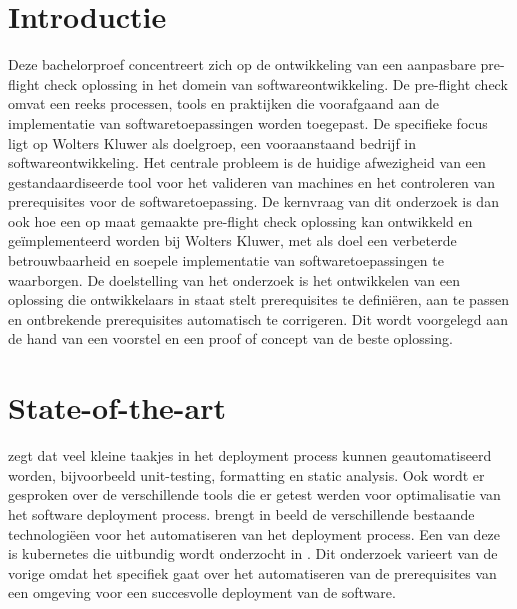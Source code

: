 
\section{Introductie}%
\label{sec:introductie}

Deze bachelorproef concentreert zich op de ontwikkeling van een aanpasbare pre-flight check oplossing in het domein van softwareontwikkeling. De pre-flight check omvat een reeks processen, tools en praktijken die voorafgaand aan de implementatie van softwaretoepassingen worden toegepast. De specifieke focus ligt op Wolters Kluwer als doelgroep, een vooraanstaand bedrijf in softwareontwikkeling. Het centrale probleem is de huidige afwezigheid van een gestandaardiseerde tool voor het valideren van machines en het controleren van prerequisites voor de softwaretoepassing. De kernvraag van dit onderzoek is dan ook hoe een op maat gemaakte pre-flight check oplossing kan ontwikkeld en geïmplementeerd worden bij Wolters Kluwer, met als doel een verbeterde betrouwbaarheid en soepele implementatie van softwaretoepassingen te waarborgen. De doelstelling van het onderzoek is het ontwikkelen van een oplossing die ontwikkelaars in staat stelt prerequisites te definiëren, aan te passen en ontbrekende prerequisites automatisch te corrigeren. Dit wordt voorgelegd aan de hand van een voorstel en een proof of concept van de beste oplossing.






\section{State-of-the-art}%
\label{sec:state-of-the-art}

\textcite{Sailer_2019} zegt dat veel kleine taakjes in het deployment process kunnen geautomatiseerd worden, bijvoorbeeld unit-testing, formatting en static analysis. Ook wordt er gesproken over de verschillende tools die er getest werden voor optimalisatie van het software deployment process. \textcite{Wurster_2019} brengt in beeld de verschillende bestaande technologiëen voor het automatiseren van het deployment process. Een van deze is kubernetes die uitbundig wordt onderzocht in \textcite{Poniszewska_Mara_da_2021}. Dit onderzoek varieert van de vorige omdat het specifiek gaat over het automatiseren van de prerequisites van een omgeving voor een succesvolle deployment van de software.


